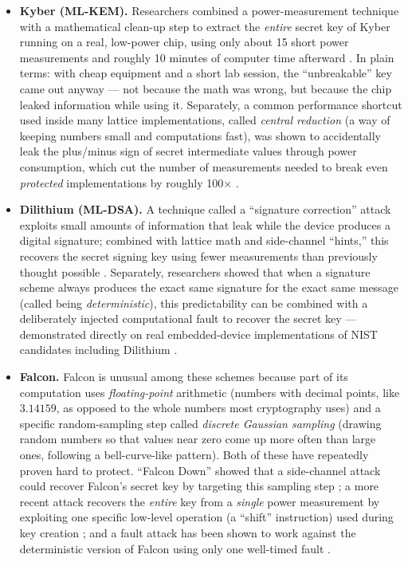 \documentclass[11pt,a4paper]{article}
\begin{document}
\begin{itemize}[leftmargin=*]
  \item \textbf{Kyber (ML-KEM).} Researchers combined a power-measurement technique with a mathematical clean-up step to extract the \emph{entire} secret key of Kyber running on a real, low-power chip, using only about 15 short power measurements and roughly 10 minutes of computer time afterward \cite{wang2024twostep}. In plain terms: with cheap equipment and a short lab session, the ``unbreakable'' key came out anyway --- not because the math was wrong, but because the chip leaked information while using it. Separately, a common performance shortcut used inside many lattice implementations, called \emph{central reduction} (a way of keeping numbers small and computations fast), was shown to accidentally leak the plus/minus sign of secret intermediate values through power consumption, which cut the number of measurements needed to break even \emph{protected} implementations by roughly 100$\times$ \cite{exploitcentralreduction2024}.
  \item \textbf{Dilithium (ML-DSA).} A technique called a ``signature correction'' attack exploits small amounts of information that leak while the device produces a digital signature; combined with lattice math and side-channel ``hints,'' this recovers the secret signing key using fewer measurements than previously thought possible \cite{signaturecorrection2022, dachmansoled2020lwesideinfo}. Separately, researchers showed that when a signature scheme always produces the exact same signature for the exact same message (called being \emph{deterministic}), this predictability can be combined with a deliberately injected computational fault to recover the secret key --- demonstrated directly on real embedded-device implementations of NIST candidates including Dilithium \cite{ravi2019exploitingdeterminism}.
  \item \textbf{Falcon.} Falcon is unusual among these schemes because part of its computation uses \emph{floating-point} arithmetic (numbers with decimal points, like $3.14159$, as opposed to the whole numbers most cryptography uses) and a specific random-sampling step called \emph{discrete Gaussian sampling} (drawing random numbers so that values near zero come up more often than large ones, following a bell-curve-like pattern). Both of these have repeatedly proven hard to protect. ``Falcon Down'' showed that a side-channel attack could recover Falcon's secret key by targeting this sampling step \cite{karabulut2021falcondown}; a more recent attack recovers the \emph{entire} key from a \emph{single} power measurement by exploiting one specific low-level operation (a ``shift'' instruction) used during key creation \cite{singletracefalcon2025}; and a fault attack has been shown to work against the deterministic version of Falcon using only one well-timed fault \cite{bauer2024falconfault}.

\end{itemize}
\end{document}
